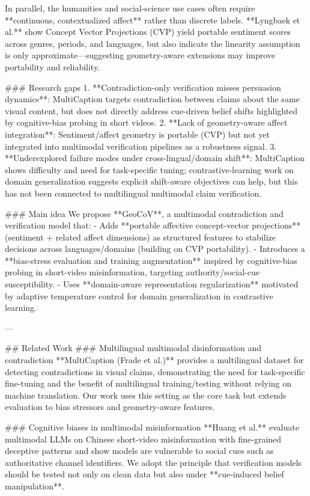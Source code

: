 In parallel, the humanities and social-science use cases often require **continuous, contextualized affect** rather than discrete labels. **Lyngbaek et al.** show Concept Vector Projections (CVP) yield portable sentiment scores across genres, periods, and languages, but also indicate the linearity assumption is only approximate—suggesting geometry-aware extensions may improve portability and reliability.

### Research gaps  
1. **Contradiction-only verification misses persuasion dynamics**: MultiCaption targets contradiction between claims about the same visual content, but does not directly address cue-driven belief shifts highlighted by cognitive-bias probing in short videos.  
2. **Lack of geometry-aware affect integration**: Sentiment/affect geometry is portable (CVP) but not yet integrated into multimodal verification pipelines as a robustness signal.  
3. **Underexplored failure modes under cross-lingual/domain shift**: MultiCaption shows difficulty and need for task-specific tuning; contrastive-learning work on domain generalization suggests explicit shift-aware objectives can help, but this has not been connected to multilingual multimodal claim verification.

### Main idea  
We propose **GeoCoV**, a multimodal contradiction and verification model that:  
- Adds **portable affective concept-vector projections** (sentiment + related affect dimensions) as structured features to stabilize decisions across languages/domains (building on CVP portability).  
- Introduces a **bias-stress evaluation and training augmentation** inspired by cognitive-bias probing in short-video misinformation, targeting authority/social-cue susceptibility.  
- Uses **domain-aware representation regularization** motivated by adaptive temperature control for domain generalization in contrastive learning.

---

## Related Work  
### Multilingual multimodal disinformation and contradiction  
**MultiCaption (Frade et al.)** provides a multilingual dataset for detecting contradictions in visual claims, demonstrating the need for task-specific fine-tuning and the benefit of multilingual training/testing without relying on machine translation. Our work uses this setting as the core task but extends evaluation to bias stressors and geometry-aware features.

### Cognitive biases in multimodal misinformation  
**Huang et al.** evaluate multimodal LLMs on Chinese short-video misinformation with fine-grained deceptive patterns and show models are vulnerable to social cues such as authoritative channel identifiers. We adopt the principle that verification models should be tested not only on clean data but also under **cue-induced belief manipulation**.

